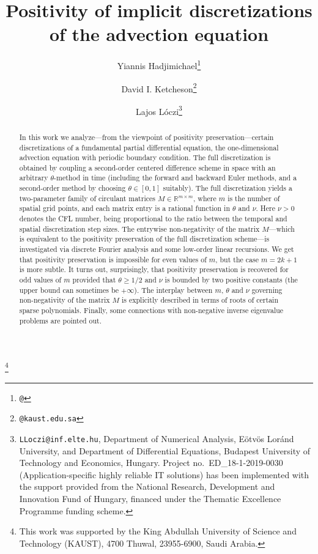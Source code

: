 \documentclass[a4paper]{article}
\title{Positivity of implicit discretizations of the advection equation}
\author{Yiannis Hadjimichael\thanks{\texttt{@} }\and David I. Ketcheson\thanks{\texttt{@kaust.edu.sa}}\and Lajos L\'oczi\thanks{{\texttt{LLoczi@inf.elte.hu}}, Department of Numerical Analysis, E\"otv\"os Lor\'and University, and Department of Differential Equations, Budapest University of Technology and Economics, Hungary. Project no.~ED\_18-1-2019-0030 (Application-specific highly reliable IT solutions) has been implemented with the support provided from the National Research, Development and Innovation Fund of Hungary, financed under the Thematic Excellence Programme funding scheme.}}
\newcommand{\te}{\theta}
\newcommand\blfootnote[1]{%
  \begingroup
  \renewcommand\thefootnote{}\footnote{#1}%
  \addtocounter{footnote}{-1}%
  \endgroup
}
\begin{document}
\maketitle
\begin{abstract}
In this work we analyze---from the viewpoint of positivity preservation---certain discretizations of a fundamental partial differential equation, the one-dimensional advection equation with periodic boundary condition. The full discretization is obtained by coupling a second-order centered difference scheme in space with an arbitrary $\te$-method in time (including the forward and backward Euler methods, and a second-order method by choosing $\te\in [0,1]$ suitably). The full discretization yields a two-parameter family of circulant matrices $M\in\mathbb{R}^{m\times m}$, 
where $m$ is the number of spatial grid points, and each matrix entry is a rational function in $\te$ and $\nu$. Here $\nu>0$ denotes the CFL number, being proportional to the ratio between the temporal and spatial discretization step sizes. The entrywise non-negativity of the matrix $M$---which is equivalent to the positivity preservation of the full discretization scheme---is investigated via discrete Fourier analysis and some low-order linear recursions. We get that positivity preservation is impossible for even values of $m$, but the case $m=2k+1$ is more subtle. It turns out, surprisingly, that positivity preservation is recovered for odd values of $m$ provided that $\te\ge 1/2$ and $\nu$ is bounded by two positive constants (the upper bound can sometimes be $+\infty$). The interplay between $m$, $\te$ and $\nu$ governing non-negativity of the matrix $M$ is explicitly described in terms of roots of certain sparse polynomials. Finally, some connections with 
non-negative inverse eigenvalue problems are pointed out.
\end{abstract}
\blfootnote{This work was supported by the King Abdullah University of Science and Technology (KAUST), 4700
Thuwal, 23955-6900, Saudi Arabia.}
\end{document}
